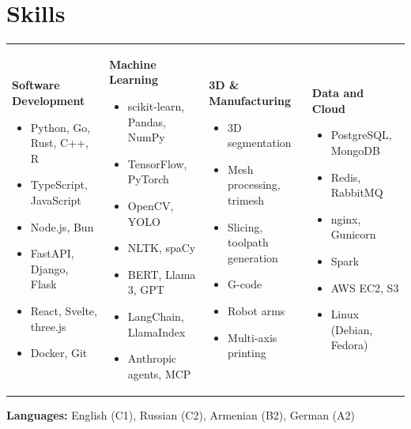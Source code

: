 \documentclass{ExpressiveResume}
\begin{document}
\section{Skills}
\noindent\begin{tabularx}{\textwidth}{@{}X@{}X@{}X@{}X@{}}
\textbf{Software Development}
\begin{itemize}
    \item Python, Go, Rust, C++, R
    \item TypeScript, JavaScript
    \item Node.js, Bun
    \item FastAPI, Django, Flask
    \item React, Svelte, three.js
    \item Docker, Git
\end{itemize}
&
\textbf{Machine Learning}
\begin{itemize}
    \item scikit-learn, Pandas, NumPy
    \item TensorFlow, PyTorch
    \item OpenCV, YOLO
    \item NLTK, spaCy
    \item BERT, Llama 3, GPT
    \item LangChain, LlamaIndex
    \item Anthropic agents, MCP
\end{itemize}
&
\textbf{3D \& Manufacturing}
\begin{itemize}
    \item 3D segmentation
    \item Mesh processing, trimesh
    \item Slicing, toolpath generation
    \item G-code
    \item Robot arms
    \item Multi-axis printing
\end{itemize}
&
\textbf{Data and Cloud}
\begin{itemize}
    \item PostgreSQL, MongoDB
    \item Redis, RabbitMQ
    \item nginx, Gunicorn
    \item Spark
    \item AWS EC2, S3
    \item Linux (Debian, Fedora)
\end{itemize}
\end{tabularx}
\par\vspace{2pt}\noindent\textbf{Languages:} English (C1), Russian (C2), Armenian (B2), German (A2)
\end{document}
